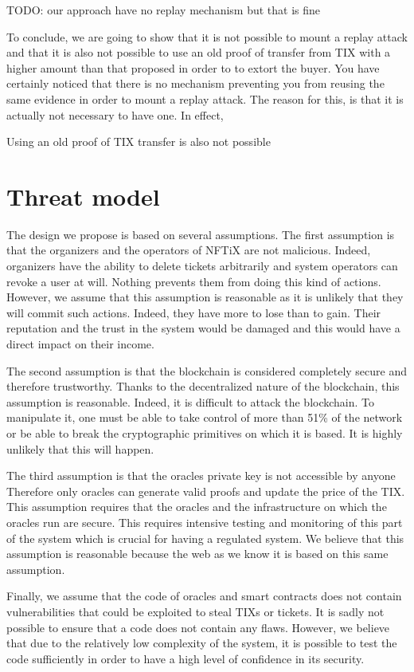 \documentclass[a4paper,11pt,oneside]{report}
\begin{document}
TODO: our approach have no replay mechanism but that is fine

To conclude, we are going to show that it is not possible to mount a replay attack and that it is also not possible to use an old proof of transfer from TIX with a higher amount than that proposed in order to to extort the buyer. You have certainly noticed that there is no mechanism preventing you from reusing the same evidence in order to mount a replay attack. The reason for this, is that it is actually not necessary to have one. In effect,

Using an old proof of TIX transfer is also not possible

\section{Threat model}
The design we propose is based on several assumptions. The first assumption is that the organizers and the operators of NFTiX are not malicious. Indeed, organizers have the ability to delete tickets arbitrarily and system operators can revoke a user at will. Nothing prevents them from doing this kind of actions. However, we assume that this assumption is reasonable as it is unlikely that they will commit such actions. Indeed, they have more to lose than to gain. Their reputation and the trust in the system would be damaged and this would have a direct impact on their income.

The second assumption is that the blockchain is considered completely secure and therefore trustworthy. Thanks to the decentralized nature of the blockchain, this assumption is reasonable. Indeed, it is difficult to attack the blockchain. To manipulate it, one must be able to take control of more than 51\% of the network or be able to break the cryptographic primitives on which it is based. It is highly unlikely that this will happen.

The third assumption is that the oracles private key is not accessible by anyone Therefore only oracles can generate valid proofs and update the price of the TIX. This assumption requires that the oracles and the infrastructure on which the oracles run are secure. This requires intensive testing and monitoring of this part of the system which is crucial for having a regulated system. We believe that this assumption is reasonable because the web as we know it is based on this same assumption.

Finally, we assume that the code of oracles and smart contracts does not contain vulnerabilities that could be exploited to steal TIXs or tickets. It is sadly not possible to ensure that a code does not contain any flaws. However, we believe that due to the relatively low complexity of the system, it is possible to test the code sufficiently in order to have a high level of confidence in its security.
\end{document}
